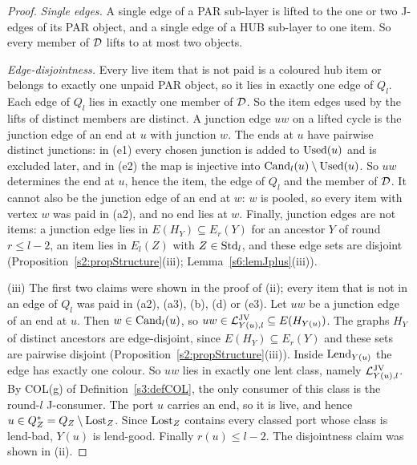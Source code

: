 \begin{proof}
\emph{Single edges.} A single edge of a PAR sub-layer is lifted to the one or two
J-edges of its PAR object, and a single edge of a HUB sub-layer to one item. So
every member of $\mathcal{D}$ lifts to at most two objects.

\emph{Edge-disjointness.} Every live item that is not paid is a coloured hub
item or belongs to exactly one unpaid PAR object, so it lies in exactly one edge
of $Q_l$. Each edge of $Q_l$ lies in exactly one member of $\mathcal{D}$. So the item
edges used by the lifts of distinct members are distinct. A junction edge $uw$
on a lifted cycle is the junction edge of an end at $u$ with junction $w$. The
ends at $u$ have pairwise distinct junctions: in (e1) every chosen junction is
added to $\mathrm{Used}(u)$ and is excluded later, and in (e2) the map is injective into
$\mathrm{Cand}_l(u)\setminus\mathrm{Used}(u)$. So $uw$ determines the end at $u$, hence the
item, the edge of $Q_l$ and the member of $\mathcal{D}$. It cannot also be the junction
edge of an end at $w$: $w$ is pooled, so every item with vertex $w$ was paid in
(a2), and no end lies at $w$. Finally, junction edges are not items: a junction
edge lies in $E(H_Y)\subseteq E_r(Y)$ for an ancestor $Y$ of round $r\le l-2$,
an item lies in $E_l(Z)$ with $Z\in\mathrm{Std}_l$, and these edge sets are disjoint
(Proposition~\ref{s2:propStructure}(iii); Lemma~\ref{s6:lemJplus}(iii)).

(iii) The first two claims were shown in the proof of (ii); every item that is
not in an edge of $Q_l$ was paid in (a2), (a3), (b), (d) or (e3). Let $uw$ be a
junction edge of an end at $u$. Then $w\in\mathrm{Cand}_l(u)$, so
$uw\in\mathcal{L}^{\mathrm{JV}}_{Y(u),l}\subseteq E(H_{Y(u)})$. The graphs $H_Y$ of distinct ancestors
are edge-disjoint, since $E(H_Y)\subseteq E_r(Y)$ and these sets are pairwise
disjoint (Proposition~\ref{s2:propStructure}(iii)). Inside $\mathrm{Lend}_{Y(u)}$ the
edge has exactly one colour. So $uw$ lies in exactly one lent class, namely
$\mathcal{L}^{\mathrm{JV}}_{Y(u),l}$. By COL(g) of Definition~\ref{s3:defCOL}, the only consumer of
this class is the round-$l$ J-consumer. The port $u$ carries an end, so it is
live, and hence $u\in Q^{*}_Z=Q_Z\setminus\mathrm{Lost}_Z$. Since $\mathrm{Lost}_Z$ contains every
classed port whose class is lend-bad, $Y(u)$ is lend-good. Finally
$r(u)\le l-2$. The disjointness claim was shown in (ii).


\end{proof}
